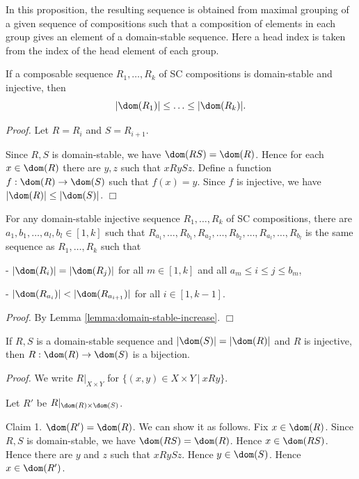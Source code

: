 In this proposition,
the resulting sequence is obtained from 
maximal grouping of a given sequence of compositions 
such that a composition of elements in each group gives 
an element of a domain-stable sequence.
Here a head index is taken from the index of the head element of each group.

\begin{Lemma}\label{lemma:domain-stable-increase}
If
a composable sequence $R_1,\ldots,R_k$ of SC compositions
is domain-stable and injective, then
\[
|\dom(R_1)| \le \ldots \le |\dom(R_k)|.
\]
\end{Lemma}

{\em Proof.}
Let $R = R_i$ and $S = R_{i+1}$.

Since $R,S$ is domain-stable, we have $\dom(RS) = \dom(R)$.
Hence for each $x \in \dom(R)$ there are $y,z$ such that $x R y S z$.
Define a function $f: \dom(R) \to \dom(S)$ such that $f(x)=y$.
Since $f$ is injective, we have $|\dom(R)| \le |\dom(S)|$.
$\Box$

\begin{Lemma}\label{lemma:cardinal-constant}
For any 
domain-stable injective
sequence $R_1,\ldots,R_k$ of SC compositions,
there are $a_1,b_1,\ldots, a_l,b_l \in [1,k]$ such that
$R_{a_1},\ldots,R_{b_1},R_{a_2},\ldots,R_{b_2},\ldots,R_{a_l},\ldots,R_{b_l}$
is the same sequence as $R_1,\ldots,R_k$ such that

- $|\dom(R_i)| = |\dom(R_j)|$ for all $m \in [1,k]$ and
all $a_m \le i \le j \le b_m$,

- $|\dom(R_{a_i})| < |\dom(R_{a_{i+1}})|$ for all $i \in [1,k-1]$.

\end{Lemma}

{\em Proof.}
By Lemma \ref{lemma:domain-stable-increase}.
$\Box$

\begin{Lemma}\label{lemma:bijection}
If $R,S$ is a domain-stable sequence
and $|\dom(S)|=|\dom(R)|$
and $R$ is injective,
then $R:\dom(R) \to \dom(S)$ is a bijection.
\end{Lemma}

{\em Proof.}
We write $R|_{X \times Y}$ for $\{ (x,y) \in X \times Y \ |\ xRy \}$.

Let $R'$ be $R|_{\dom(R) \times \dom(S)}$.

Claim 1. $\dom(R')=\dom(R)$.
We can show it as follows.
Fix $x \in \dom(R)$.
Since $R,S$ is domain-stable, we have $\dom(RS) = \dom(R)$.
Hence $x \in \dom(RS)$.
Hence there are $y$ and $z$ such that $x R y S z$.
Hence $y \in \dom(S)$.
Hence $x \in \dom(R')$.

